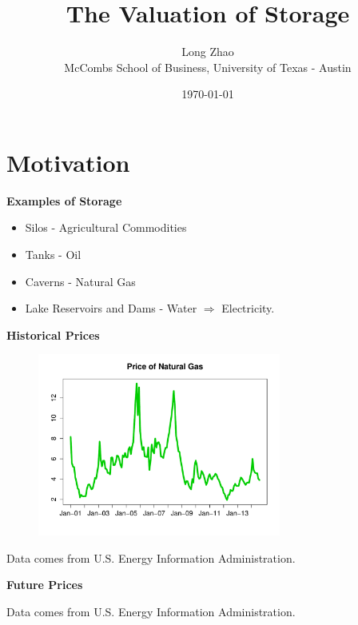 \documentclass{beamer}
\title[Short title]{The Valuation of Storage} %
\author{Long Zhao\\ {\footnotesize McCombs School of Business, University of Texas - Austin}} %
\institute[UT Austin] %
{
 \small{Joint work with Kumar Muthuraman and Stathis Tompaidis}\\ %
\medskip
}
\date{\today} %
\begin{document}
\begin{frame}
\titlepage %
\end{frame}

\section{Motivation}

\begin{frame}
{\bf Examples of Storage}
\begin{itemize}
  \item Silos - Agricultural Commodities
  \item Tanks - Oil
  \item Caverns - Natural Gas 
  \item Lake Reservoirs and Dams - Water $\Rightarrow$ Electricity.          
  \end{itemize}
\end{frame}

\begin{frame}
{\bf Historical Prices}
\begin{figure}[hbt]
  \includegraphics[width = 8cm]{PriceNG.pdf}
\end{figure}
\begin{center}
Data comes from U.S. Energy Information Administration.
\end{center}
\end{frame}

\begin{frame}
{\bf Future Prices}
\begin{center}
Data comes from U.S. Energy Information Administration.
\end{center}
\end{frame}
\end{document}
